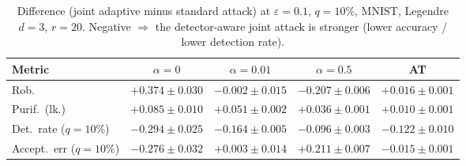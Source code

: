 \begin{table}[htbp]
  \centering
  \begin{tabular}{lcccc}
    \toprule
    Metric & $\alpha{=}0$ & $\alpha{=}0.01$ & $\alpha{=}0.5$ & AT \\
    \midrule
    Rob. & $+0.374 \pm 0.030$ & $-0.002 \pm 0.015$ & $-0.207 \pm 0.006$ & $+0.016 \pm 0.001$ \\
    Purif.\ (lk.) & $+0.085 \pm 0.010$ & $+0.051 \pm 0.002$ & $+0.036 \pm 0.001$ & $+0.010 \pm 0.001$ \\
    Det.\ rate ($q{=}10\%$) & $-0.294 \pm 0.025$ & $-0.164 \pm 0.005$ & $-0.096 \pm 0.003$ & $-0.122 \pm 0.010$ \\
    Accept.\ err ($q{=}10\%$) & $-0.276 \pm 0.032$ & $+0.003 \pm 0.014$ & $+0.211 \pm 0.007$ & $-0.015 \pm 0.001$ \\
    \bottomrule
  \end{tabular}
  \caption{Difference (joint adaptive minus standard attack) at $\varepsilon=0.1$, $q{=}10\%$, MNIST, Legendre $d{=}3$, $r{=}20$. Negative $\Rightarrow$ the detector-aware joint attack is stronger (lower accuracy / lower detection rate).}
  \label{tab:joint_vs_normal_mnist_eps0.1}
\end{table}
